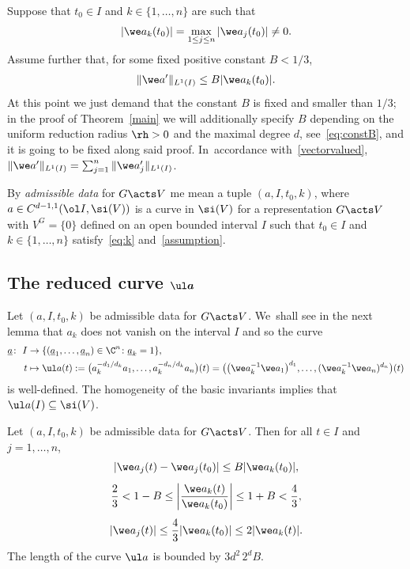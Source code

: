 Suppose that $t_0 \in I$ and $k \in \{1,\dots,n\}$ are such that
\begin{gather} \label{eq:k}
 |\we a_k(t_0)| = \max_{1 \le j \le n} |\we a_j(t_0)| \ne 0.
 \end{gather}
Assume further that, for some fixed positive constant $B < 1/3$,
\begin{gather}\label{assumption}
 \|\we a'\|_{L^1 (I)} \le B |\we a_k(t_0)|.
\end{gather}
At this point we just demand that the constant $B$ is fixed and smaller than $1/3$; in the proof of Theorem~\ref{main}
we will additionally specify $B$ depending on the uniform reduction radius $\rh>0$ and the maximal degree $d$, see~\eqref{eq:constB},
and it is going to be fixed along said proof. In~accordance with~\eqref{vectorvalued}, $\|\we a'\|_{L^1 (I)} = \sum_{j=1}^n \|\we a_j'\|_{L^1 (I)}$.

\begin{Definition}
 By \emph{admissible data} for $G \acts V$ me mean a tuple $(a, I, t_0, k)$, where
 $a \in C^{d-1,1}(\ol I,\si(V))$ is a curve in $\si(V)$ for a representation $G \acts V$ with $V^G = \{0\}$
 defined on an open bounded interval $I$ such that
 $t_0 \in I$ and $k \in \{1,\dots,n\}$ satisfy~\eqref{eq:k} and~\eqref{assumption}.
\end{Definition}




\subsection[The reduced curve a]{The reduced curve $\boldsymbol{\ul a}$}

Let $(a, I, t_0, k)$ be admissible data for $G \acts V$. We~shall see in the next lemma that
$a_k$ does not vanish on the interval $I$ and so the curve
\begin{align}
 \underline a \colon\ I &\to \{(\underline a_1,\dots,\underline a_n) \in \C^{n} \colon \underline a_k=1\}, \notag
 \\
 t &\mapsto \ul a(t) := \big( a_k^{-d_1/d_k} a_1, \dots, a_k^{-d_n/d_k} a_n\big)(t)
 = \big( \big(\we a_k^{-1} \we a_1\big)^{d_1}, \dots, (\we a_k^{-1} \we a_n)^{d_n}\big)(t)
 \label{curve}
\end{align}
is well-defined. The homogeneity of the basic invariants implies that $\ul a(I) \subseteq \si(V)$.

\begin{Lemma} \label{lem1}
 Let $(a, I, t_0, k)$ be admissible data for $G \acts V$.
 Then for all $t \in I$ and $j=1,\dots,n$,
 \begin{gather} \label{eq:ass10}
 |\we a_j (t) - \we a_j (t_0)| \le B |\we a_k (t_0)|,
 \\[1ex]
 \frac 2 3 < 1-B \le \bigg | \frac{\we a_k(t)}{\we a_k(t_0)} \bigg | \le 1+B < \frac4 3,\label{eq:ass11}
 \\[1ex]
 |\we a_j(t)| \le \frac 4 3 |\we a_k(t_0)| \le 2 |\we a_k(t)|.\label{eq:ass12}
 \end{gather}
 The length of the curve $\ul a$
 is bounded by $3 d^2\, 2^{d} B$.
\end{Lemma}

